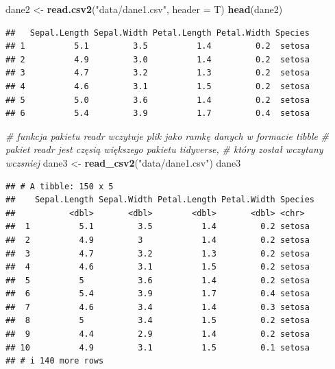 \documentclass[
]{book}
\newenvironment{Shaded}{\begin{snugshade}}{\end{snugshade}}
\newcommand{\AttributeTok}[1]{\textcolor[rgb]{0.13,0.29,0.53}{#1}}
\newcommand{\CommentTok}[1]{\textcolor[rgb]{0.56,0.35,0.01}{\textit{#1}}}
\newcommand{\FunctionTok}[1]{\textcolor[rgb]{0.13,0.29,0.53}{\textbf{#1}}}
\newcommand{\NormalTok}[1]{#1}
\newcommand{\OtherTok}[1]{\textcolor[rgb]{0.56,0.35,0.01}{#1}}
\newcommand{\StringTok}[1]{\textcolor[rgb]{0.31,0.60,0.02}{#1}}
\theoremstyle{plain}
\theoremstyle{definition}
\theoremstyle{definition}
\theoremstyle{definition}
\theoremstyle{definition}
\theoremstyle{definition}
\theoremstyle{remark}
\begin{document}
\begin{Shaded}
\begin{Highlighting}[]
\NormalTok{dane2 }\OtherTok{\textless{}{-}} \FunctionTok{read.csv2}\NormalTok{(}\StringTok{"data/dane1.csv"}\NormalTok{, }\AttributeTok{header =}\NormalTok{ T)}
\FunctionTok{head}\NormalTok{(dane2)}
\end{Highlighting}
\end{Shaded}

\begin{verbatim}
##   Sepal.Length Sepal.Width Petal.Length Petal.Width Species
## 1          5.1         3.5          1.4         0.2  setosa
## 2          4.9         3.0          1.4         0.2  setosa
## 3          4.7         3.2          1.3         0.2  setosa
## 4          4.6         3.1          1.5         0.2  setosa
## 5          5.0         3.6          1.4         0.2  setosa
## 6          5.4         3.9          1.7         0.4  setosa
\end{verbatim}

\begin{Shaded}
\begin{Highlighting}[]
\CommentTok{\# funkcja pakietu readr wczytuje plik jako ramkę danych w formacie tibble}
\CommentTok{\# pakiet readr jest częsią większego pakietu tidyverse, }
\CommentTok{\# który został wczytany wczsniej}
\NormalTok{dane3 }\OtherTok{\textless{}{-}} \FunctionTok{read\_csv2}\NormalTok{(}\StringTok{"data/dane1.csv"}\NormalTok{)}
\NormalTok{dane3}
\end{Highlighting}
\end{Shaded}

\begin{verbatim}
## # A tibble: 150 x 5
##    Sepal.Length Sepal.Width Petal.Length Petal.Width Species
##           <dbl>       <dbl>        <dbl>       <dbl> <chr>  
##  1          5.1         3.5          1.4         0.2 setosa 
##  2          4.9         3            1.4         0.2 setosa 
##  3          4.7         3.2          1.3         0.2 setosa 
##  4          4.6         3.1          1.5         0.2 setosa 
##  5          5           3.6          1.4         0.2 setosa 
##  6          5.4         3.9          1.7         0.4 setosa 
##  7          4.6         3.4          1.4         0.3 setosa 
##  8          5           3.4          1.5         0.2 setosa 
##  9          4.4         2.9          1.4         0.2 setosa 
## 10          4.9         3.1          1.5         0.1 setosa 
## # i 140 more rows
\end{verbatim}
\end{document}
